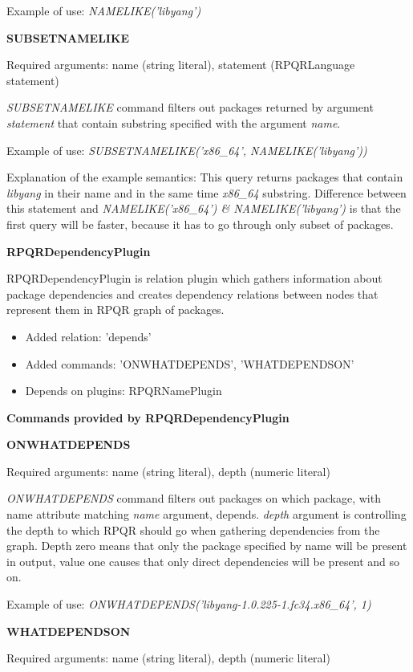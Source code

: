 Example of use: \textit{NAMELIKE('libyang')}

\textbf{SUBSETNAMELIKE}

Required arguments: name (string literal), statement (RPQRLanguage statement)

\textit{SUBSETNAMELIKE} command filters out packages returned by argument \textit{statement} that
contain substring specified with the argument \textit{name}.

Example of use: \textit{SUBSETNAMELIKE('x86\_64', NAMELIKE('libyang'))}

Explanation of the example semantics: This query returns packages that contain \textit{libyang} in their
name and in the same time \textit{x86\_64} substring. Difference between this statement and
\textit{NAMELIKE('x86\_64') \& NAMELIKE('libyang')} is that the first query will be faster, because
it has to go through only subset of packages.

\textbf{RPQRDependencyPlugin}

RPQRDependencyPlugin is relation plugin which gathers information about package dependencies and
creates dependency relations between nodes that represent them in RPQR graph of packages.

\begin{itemize}
  \item Added relation: 'depends'
  \item Added commands: 'ONWHATDEPENDS', 'WHATDEPENDSON'
  \item Depends on plugins: RPQRNamePlugin
\end{itemize}

\textbf{Commands provided by RPQRDependencyPlugin}

\textbf{ONWHATDEPENDS}

Required arguments: name (string literal), depth (numeric literal)

\textit{ONWHATDEPENDS} command filters out packages on which package, with name attribute matching
\textit{name} argument, depends. \textit{depth} argument is controlling the depth to which RPQR
should go when gathering dependencies from the graph. Depth zero means that only the package specified
by name will be present in output, value one causes that only direct dependencies will be present and
so on.

Example of use: \textit{ONWHATDEPENDS('libyang-1.0.225-1.fc34.x86\_64', 1)}

\textbf{WHATDEPENDSON}

Required arguments: name (string literal), depth (numeric literal)

